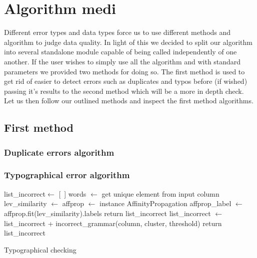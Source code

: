\documentclass{article}
\begin{document}

\section{Algorithm medi} %
\label{sec:Algorithm}
Different error types and data types force us to use different methods and algorithm to judge data quality. In light of this we decided to split our algorithm into several standalone module capable of being called independently of one another.
If the user wishes to simply use all the algorithm and with standard parameters we provided two methods for doing so. The first method is used to get rid of easier to detect errors such as duplicates and typos before (if wished) passing it's results to the second method which will be a more in depth check.
Let us then follow our outlined methods and inspect the first method algorithms.


\subsection{First method}
\subsubsection{Duplicate errors algorithm}
\subsubsection{Typographical error algorithm}

\begin{algorithm}[H]
    \BlankLine

    list\_incorrect$\leftarrow$ [~]\;
    words $\leftarrow$ get unique element from input column\;
    {
        lev\_similarity $\leftarrow$ 
        affprop $\leftarrow$ instance AffinityPropagation\;
        affprop\_label $\leftarrow$ affprop.fit(lev\_similarity).labels \;
        {
            return list\_incorrect\;
        }
        {
            {list\_incorrect $\leftarrow$ list\_incorrect + incorrect\_grammar(column, cluster, threshold)\;}
        }
        return list\_incorrect
    }
    \caption{Typographical checking\label{typo}}
\end{algorithm}
\end{document}

